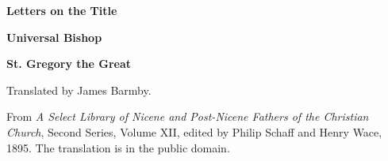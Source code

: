 \documentclass[11pt,letterpaper]{article}
\begin{document}
\color{ink}

\begin{titlepage}
\centering
\vspace*{4em}
{\LARGE\bfseries\color{heading} Letters on the Title\par}
\vspace{0.5em}
{\LARGE\bfseries\color{heading} Universal Bishop\par}
\vspace{2em}
{\LARGE\bfseries\color{heading} St. Gregory the Great\par}
\vspace{3em}
{Translated by James Barmby.\par}
\vfill
{\small From \emph{A Select Library of Nicene and Post-Nicene Fathers of the
Christian Church}, Second Series, Volume XII, edited by Philip Schaff and
Henry Wace, 1895. The translation is in the public domain.\par}
\vspace{2em}
\end{titlepage}

\tableofcontents
\clearpage


\end{document}
